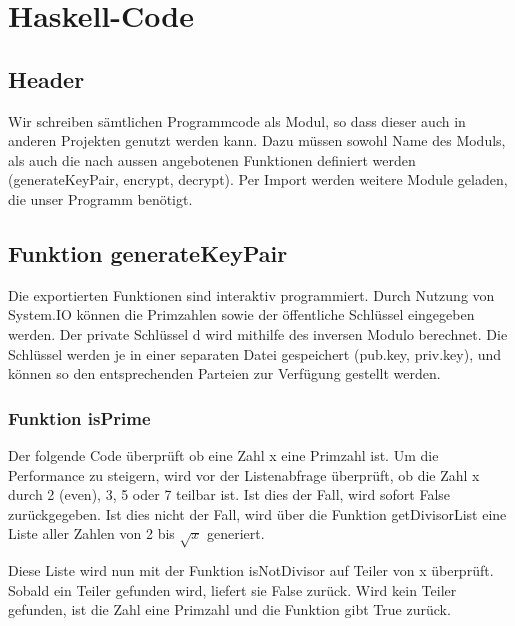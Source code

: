 \documentclass[a4paper, 11pt]{article} %
\begin{document}
\section{Haskell-Code}
\subsection{Header}
Wir schreiben sämtlichen Programmcode als Modul, so dass dieser auch in anderen Projekten genutzt werden kann. Dazu müssen sowohl Name des Moduls, als auch die nach aussen angebotenen Funktionen definiert werden (generateKeyPair, encrypt, decrypt). Per Import werden weitere Module geladen, die unser Programm benötigt.


\subsection{Funktion generateKeyPair}
Die exportierten Funktionen sind interaktiv programmiert. Durch Nutzung von System.IO können die Primzahlen sowie der öffentliche Schlüssel eingegeben werden. Der private Schlüssel d wird mithilfe des inversen Modulo berechnet.
Die Schlüssel werden je in einer separaten Datei gespeichert (pub.key, priv.key), und können so den entsprechenden Parteien zur Verfügung gestellt werden.




\subsubsection{Funktion isPrime}
Der folgende Code überprüft ob eine Zahl x eine Primzahl ist. Um die Performance zu steigern, wird vor der Listenabfrage überprüft, ob die Zahl x durch 2 (even), 3, 5 oder 7 teilbar ist. Ist dies der Fall, wird sofort False zurückgegeben.
Ist dies nicht der Fall, wird über die Funktion getDivisorList eine Liste aller Zahlen von 2 bis $\sqrt{x}$ generiert.

Diese Liste wird nun mit der Funktion isNotDivisor auf Teiler von x überprüft. Sobald ein Teiler gefunden wird, liefert sie False zurück. Wird kein Teiler gefunden, ist die Zahl eine Primzahl und die Funktion gibt True zurück.

\end{document}

